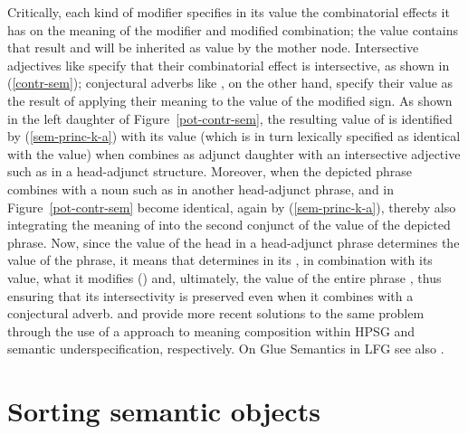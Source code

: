 \documentclass[output=paper
 	        ,biblatex
                ,babelshorthands
                ,newtxmath
                ,draftmode
                ,colorlinks, citecolor=brown
]{langscibook}
\begin{document}
Critically, each kind of modifier specifies in its  value the combinatorial effects it has on the meaning of the modifier and modified combination; the  value contains that result and will be inherited as  value by the mother node. Intersective adjectives like  specify that their combinatorial effect is intersective, as shown in (\ref{contr-sem}); conjectural adverbs like , on the other hand, specify their  value as the result of applying their meaning to the  value of the modified sign. As shown in the left daughter of Figure~\ref{pot-contr-sem}, the resulting  value of  is identified by (\ref{sem-princ-k-a}) with its  value (which is in turn lexically specified as identical with the  value) when  combines as adjunct daughter with an intersective adjective such as  in a head-adjunct structure. Moreover, when the depicted phrase  combines with a noun such as  in another head-adjunct phrase,  and  in Figure~\ref{pot-contr-sem} become identical, again by (\ref{sem-princ-k-a}), thereby also integrating the meaning of  into the second conjunct of the  value of the depicted phrase. Now, since the  value of the head in a head-adjunct phrase determines the  value of the phrase, it means that  determines in its , in combination with its  value, what it modifies () and, ultimately, the  value of the entire phrase , thus ensuring that its intersectivity is preserved even when it combines with a conjectural adverb. \citet{AsudehandCrouch2002} and \citet{Egg2004a} provide more recent solutions to the same problem through the use of a  approach to meaning composition within HPSG and semantic underspecification, respectively. On Glue Semantics in LFG see also .

\section{Sorting semantic objects}
\end{document}
